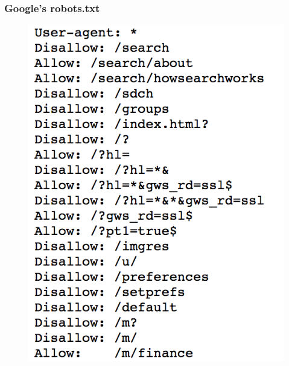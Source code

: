 \begin{frame}
    \frametitle{Google's robots.txt}
\begin{figure}[htb]
\includegraphics[scale=0.27,left]{img/figures/google_robots}
\end{figure}
\end{frame}

